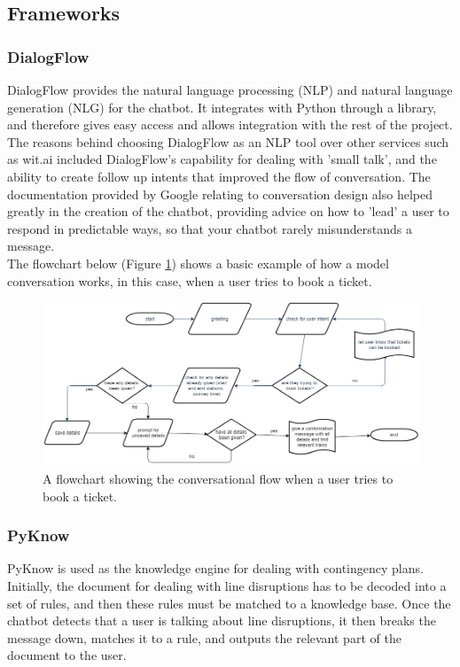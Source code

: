 \documentclass[12pt,a4paper]{article}
\begin{document}
    \subsection{Frameworks}
    
    \subsubsection*{DialogFlow}
    DialogFlow provides the natural language processing (NLP) and natural language generation (NLG) for the chatbot. It integrates with Python through a library, and therefore gives easy access and allows integration with the rest of the project. The reasons behind choosing DialogFlow as an NLP tool over other services such as wit.ai included DialogFlow's capability for dealing with 'small talk', and the ability to create follow up intents that improved the flow of conversation. The documentation provided by Google relating to conversation design also helped greatly in the creation of the chatbot, providing advice on how to 'lead' a user to respond in predictable ways, so that your chatbot rarely misunderstands a message. \\
    
    The flowchart below (Figure \ref{fig:overall_flowchart}) shows a basic example of how a model conversation works, in this case, when a user tries to book a ticket.
    
    \begin{figure}[H]
        \centering
        \includegraphics[scale=0.4]{Images/flowchart_overall.png}
        \caption{A flowchart showing the conversational flow when a user tries to book a ticket.}
        \label{fig:overall_flowchart}
    \end{figure}
    
    \subsubsection*{PyKnow}
    PyKnow is used as the knowledge engine for dealing with contingency plans. Initially, the document for dealing with line disruptions has to be decoded into a set of rules, and then these rules must be matched to a knowledge base. Once the chatbot detects that a user is talking about line disruptions, it then breaks the message down, matches it to a rule, and outputs the relevant part of the document to the user.
    
\end{document}
